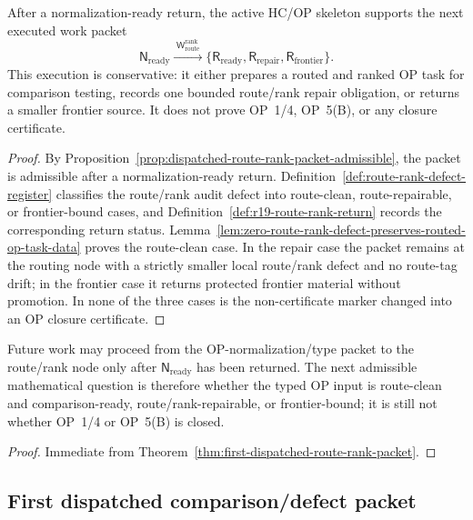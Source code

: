 \begin{theorem}
\label{thm:first-dispatched-route-rank-packet}
After a normalization-ready return, the active HC/OP skeleton supports the next executed work packet
\[
 \mathsf N_{\mathrm{ready}}
 \xrightarrow{\;\mathsf W_{\mathrm{route}}^{\mathrm{rank}}\;}
 \{\mathsf R_{\mathrm{ready}},\mathsf R_{\mathrm{repair}},\mathsf R_{\mathrm{frontier}}\}.
\]
This execution is conservative: it either prepares a routed and ranked OP task for comparison testing, records one bounded route/rank repair obligation, or returns a smaller frontier source. It does not prove OP~1/4, OP~5(B), or any closure certificate.
\end{theorem}

\begin{proof}
By Proposition~\ref{prop:dispatched-route-rank-packet-admissible}, the packet is admissible after a normalization-ready return. Definition~\ref{def:route-rank-defect-register} classifies the route/rank audit defect into route-clean, route-repairable, or frontier-bound cases, and Definition~\ref{def:r19-route-rank-return} records the corresponding return status. Lemma~\ref{lem:zero-route-rank-defect-preserves-routed-op-task-data} proves the route-clean case. In the repair case the packet remains at the routing node with a strictly smaller local route/rank defect and no route-tag drift; in the frontier case it returns protected frontier material without promotion. In none of the three cases is the non-certificate marker changed into an OP closure certificate.
\end{proof}

\begin{corollary}
\label{cor:v3340-r19-working-rule}
Future work may proceed from the OP-normalization/type packet to the route/rank node only after \(\mathsf N_{\mathrm{ready}}\) has been returned. The next admissible mathematical question is therefore whether the typed OP input is route-clean and comparison-ready, route/rank-repairable, or frontier-bound; it is still not whether OP~1/4 or OP~5(B) is closed.
\end{corollary}

\begin{proof}
Immediate from Theorem~\ref{thm:first-dispatched-route-rank-packet}.
\end{proof}


\subsection{First dispatched comparison/defect packet}
\label{subsec:first-dispatched-comparison-defect-packet}

